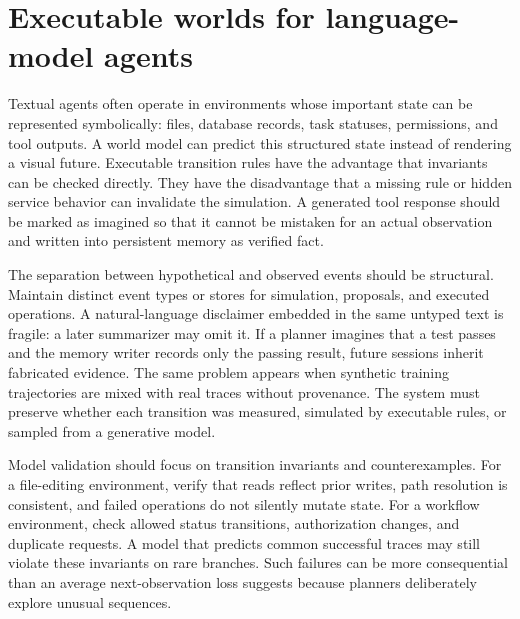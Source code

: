 \section{Executable worlds for language-model agents}
\label{sec:C06:executable}
Textual agents often operate in environments whose important state can be represented symbolically: files, database records, task statuses, permissions, and tool outputs. A world model can predict this structured state instead of rendering a visual future. Executable transition rules have the advantage that invariants can be checked directly. They have the disadvantage that a missing rule or hidden service behavior can invalidate the simulation. A generated tool response should be marked as imagined so that it cannot be mistaken for an actual observation and written into persistent memory as verified fact.

The separation between hypothetical and observed events should be structural. Maintain distinct event types or stores for simulation, proposals, and executed operations. A natural-language disclaimer embedded in the same untyped text is fragile: a later summarizer may omit it. If a planner imagines that a test passes and the memory writer records only the passing result, future sessions inherit fabricated evidence. The same problem appears when synthetic training trajectories are mixed with real traces without provenance. The system must preserve whether each transition was measured, simulated by executable rules, or sampled from a generative model.

Model validation should focus on transition invariants and counterexamples. For a file-editing environment, verify that reads reflect prior writes, path resolution is consistent, and failed operations do not silently mutate state. For a workflow environment, check allowed status transitions, authorization changes, and duplicate requests. A model that predicts common successful traces may still violate these invariants on rare branches. Such failures can be more consequential than an average next-observation loss suggests because planners deliberately explore unusual sequences.

